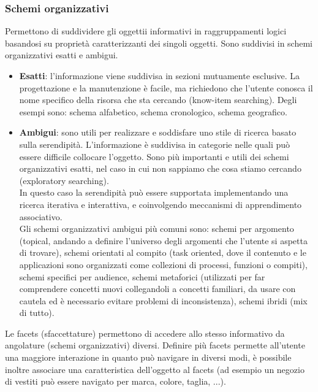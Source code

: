 \documentclass{article}
\begin{document}
\subsubsection{Schemi organizzativi}
Permettono di suddividere gli oggettii informativi in raggruppamenti logici basandosi su proprietà caratterizzanti dei singoli oggetti. Sono suddivisi in schemi organizzativi esatti e ambigui.
\begin{itemize}
	\item \textbf{Esatti}: l'informazione viene suddivisa in sezioni mutuamente esclusive. La progettazione e la manutenzione è facile, ma richiedono che l'utente conosca il nome specifico della risorsa che sta cercando (know-item searching). Degli esempi sono: schema alfabetico, schema cronologico, schema geografico. 
	\item \textbf{Ambigui}: sono utili per realizzare e soddisfare uno stile di ricerca basato sulla serendipità. L'informazione è suddivisa in categorie nelle quali può essere difficile collocare l'oggetto. Sono più importanti e utili dei schemi organizzativi esatti, nel caso in cui non sappiamo che cosa stiamo cercando (exploratory searching).\\
	In questo caso la serendipità può essere supportata implementando una ricerca iterativa e interattiva, e coinvolgendo meccanismi di apprendimento associativo.\\
	Gli schemi organizzativi ambigui più comuni sono: schemi per argomento (topical, andando a definire l'universo degli argomenti che l'utente si aspetta di trovare), schemi orientati al compito (task oriented, dove il contenuto e le applicazioni sono organizzati come collezioni di processi, funzioni o compiti), schemi specifici per audience, schemi metaforici (utilizzati per far comprendere concetti nuovi collegandoli a concetti familiari, da usare con cautela ed è necessario evitare problemi di inconsistenza), schemi ibridi (mix di tutto).
\end{itemize}
Le facets (sfaccettature) permettono di accedere allo stesso informativo da angolature (schemi organizzativi) diversi. Definire più facets permette all'utente una maggiore interazione in quanto può navigare in diversi modi, è possibile inoltre associare una caratteristica dell'oggetto al facets (ad esempio un negozio di vestiti può essere navigato per marca, colore, taglia, ...).
\end{document}
